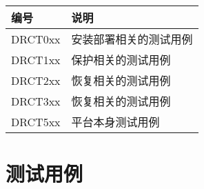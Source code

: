\begin{table}[htbp]
\begin{minipage}{\linewidth}
\setlength{\tymax}{0.5\linewidth}
\centering
\small
\begin{tabulary}{\textwidth}{@{}LL@{}} \toprule
编号&说明\\
\midrule
DRCT0xx&安装部署相关的测试用例\\
DRCT1xx&保护相关的测试用例\\
DRCT2xx&恢复相关的测试用例\\
DRCT3xx&恢复相关的测试用例\\
DRCT5xx&平台本身测试用例\\

\bottomrule

\end{tabulary}
\end{minipage}
\end{table}

\section{测试用例}
\label{测试用例}

